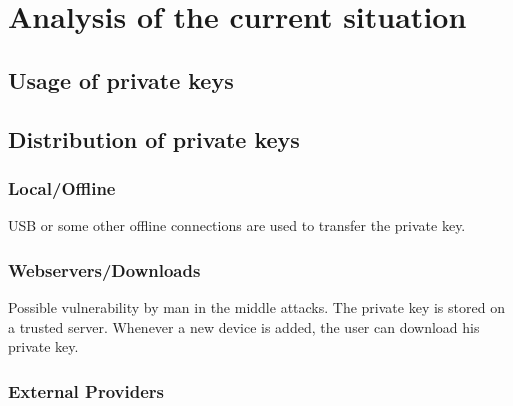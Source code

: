 \documentclass[12pt,oneside,a4paper,parskip]{scrbook}
\begin{document}


\chapter{Analysis of the current situation}

\section{Usage of private keys}

\section{Distribution of private keys}

\subsection{Local/Offline}

USB or some other offline connections are used to transfer the private key.



\subsection{Webservers/Downloads}

Possible vulnerability by man in the middle attacks.
The private key is stored on a trusted server. Whenever a new device is added, the user can download his private key.

\subsection{External Providers}
\end{document}
